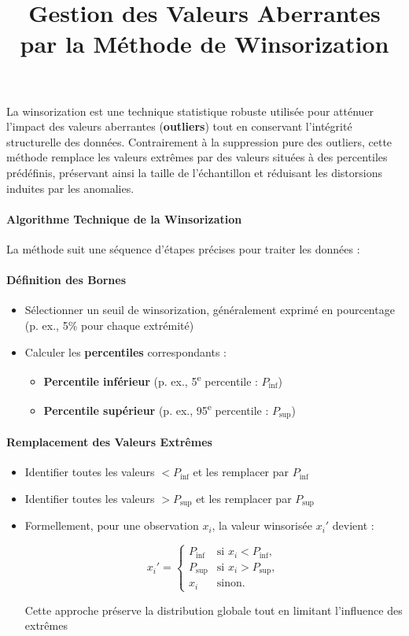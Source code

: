 \documentclass{article}
\title{Gestion des Valeurs Aberrantes par la Méthode de Winsorization}
\author{}
\date{}
\begin{document}
\maketitle


La winsorization est une technique statistique robuste utilisée pour atténuer l'impact des valeurs aberrantes (\textbf{outliers}) tout en conservant l'intégrité structurelle des données. Contrairement à la suppression pure des outliers, cette méthode remplace les valeurs extrêmes par des valeurs situées à des percentiles prédéfinis, préservant ainsi la taille de l'échantillon et réduisant les distorsions induites par les anomalies.

\paragraph*{Algorithme Technique de la Winsorization}
La méthode suit une séquence d'étapes précises pour traiter les données :

\paragraph*{Définition des Bornes}
\begin{itemize}
    \item Sélectionner un seuil de winsorization, généralement exprimé en pourcentage (p. ex., 5\% pour chaque extrémité)
    \item Calculer les \textbf{percentiles} correspondants :
    \begin{itemize}
        \item \textbf{Percentile inférieur} (p. ex., 5\textsuperscript{e} percentile : $P_{\text{inf}}$)
        \item \textbf{Percentile supérieur} (p. ex., 95\textsuperscript{e} percentile : $P_{\text{sup}}$) \cite{investopedia, amplitude}
    \end{itemize}
\end{itemize}

\paragraph*{Remplacement des Valeurs Extrêmes}
\begin{itemize}
    \item Identifier toutes les valeurs $< P_{\text{inf}}$ et les remplacer par $P_{\text{inf}}$
    \item Identifier toutes les valeurs $> P_{\text{sup}}$ et les remplacer par $P_{\text{sup}}$
    \item Formellement, pour une observation $x_i$, la valeur winsorisée $x_i'$ devient :
    
    \[
    x_i' = 
    \begin{cases} 
    P_{\text{inf}} & \text{si } x_i < P_{\text{inf}}, \\
    P_{\text{sup}} & \text{si } x_i > P_{\text{sup}}, \\
    x_i & \text{sinon}.
    \end{cases}
    \]
    
    Cette approche préserve la distribution globale tout en limitant l'influence des extrêmes \cite{datacamp, wikipedia}
\end{itemize}
\end{document}
